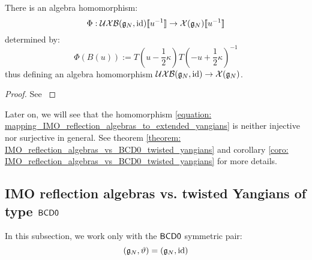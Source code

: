            \begin{proposition} \label{prop: mapping_IMO_reflection_algebras_to_extended_yangians}
                There is an algebra homomorphism:
                    \begin{equation} \label{equation: mapping_IMO_reflection_algebras_to_extended_yangians}
                        \Phi: \mathcal{UXB}(\mathfrak{g}_N, \mathrm{id})[\![u^{-1}]\!] \to \mathcal{X}(\mathfrak{g}_N)[\![u^{-1}]\!]
                    \end{equation}
                determined by:
                    $$\Phi(B(u)) := T\left(u - \frac12 \kappa\right) T\left(-u + \frac12 \kappa\right)^{-1}$$
                thus defining an algebra homomorphism $\mathcal{UXB}(\mathfrak{g}_N, \mathrm{id}) \to \mathcal{X}(\mathfrak{g}_N)$.
            \end{proposition}
                \begin{proof}
                    See \cite[Proposition 3.2]{isaev_molev_ogievetsky_fusion_for_brauer_algebras_2}
                \end{proof}
            \begin{remark}
                Later on, we will see that the homomorphism \eqref{equation: mapping_IMO_reflection_algebras_to_extended_yangians} is neither injective nor surjective in general. See theorem \ref{theorem: IMO_reflection_algebras_vs_BCD0_twisted_yangians} and corollary \ref{coro: IMO_reflection_algebras_vs_BCD0_twisted_yangians} for more details.
            \end{remark}

        \subsection{IMO reflection algebras vs. twisted Yangians of type \texorpdfstring{$\mathsf{B}\mathsf{C}\mathsf{D}\mathsf{0}$}{}}
            In this subsection, we work only with the $\mathsf{B}\mathsf{C}\mathsf{D}\mathsf{0}$ symmetric pair:
                $$(\mathfrak{g}_N, \vartheta) = (\mathfrak{g}_N, \mathrm{id})$$

